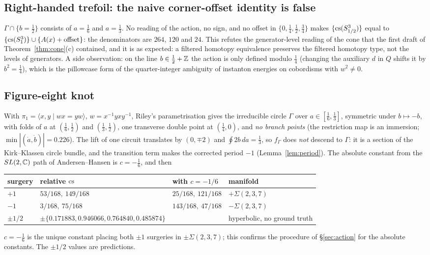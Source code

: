 \subsection{Right-handed trefoil: the naive corner-offset identity is false}
$\Gamma\cap\{b=\tfrac12\}$ consists of $a=\tfrac16$ and $a=\tfrac13$.  No reading of the action, no sign, and no offset
in $\{0,\tfrac14,\tfrac12,\tfrac34\}$ makes $\{\mathrm{cs}(S^3_{1/2})\}$ equal to $\{\mathrm{cs}(S^3_1)\}\cup\{A(x)+\text{offset}\}$:
the denominators are $264$, $120$ and $24$.  This refutes the generator-level reading of the cone that the first
draft of Theorem~\ref{thm:cone}(c) contained, and it is as expected: a filtered homotopy equivalence preserves the
filtered homotopy type, not the levels of generators.  A side observation: on the line $b\in\tfrac12+\mathbb{Z}$ the action
is only defined modulo $\tfrac14$ (changing the auxiliary $d$ in $Q$ shifts it by $b^2=\tfrac14$), which is the
pillowcase form of the quarter-integer ambiguity of instanton energies on cobordisms with $w^2\ne0$.

\subsection{Figure-eight knot}
With $\pi_1=\langle x,y\mid wx=yw\rangle$, $w=x^{-1}yxy^{-1}$, Riley's parametrisation gives the irreducible circle
$\Gamma$ over $a\in[\tfrac16,\tfrac13]$, symmetric under $b\mapsto-b$, with folds of $a$ at $(\tfrac16,\tfrac12)$ and
$(\tfrac13,\tfrac12)$, one transverse double point at $(\tfrac14,0)$, and \emph{no branch points} (the restriction
map is an immersion; $\min|(\dot a,\dot b)|=0.226$).  The lift of one circuit translates by $(0,\mp2)$ and
$\oint2b\,da=\tfrac13$, so $f_\Gamma$ does \emph{not} descend to $\Gamma$: it is a section of the Kirk--Klassen circle
bundle, and the transition term makes the corrected period $-1$ (Lemma~\ref{lem:period}).
The absolute constant from the $SL(2,\mathbb{C})$ path of Andersen--Hansen is $c=-\tfrac16$, and then
\begin{center}\small
\begin{tabular}{llll}
\toprule
surgery & relative $\mathrm{cs}$ & with $c=-1/6$ & manifold\\
\midrule
$+1$ & $53/168,\ 149/168$ & $25/168,\ 121/168$ & $+\Sigma(2,3,7)$\\
$-1$ & $3/168,\ 75/168$ & $143/168,\ 47/168$ & $-\Sigma(2,3,7)$\\
$\pm1/2$ & $\pm\{0.171883,0.946066,0.764840,0.485874\}$ & & hyperbolic, no ground truth\\
\bottomrule
\end{tabular}
\end{center}
$c=-\tfrac16$ is the unique constant placing both $\pm1$ surgeries in $\pm\Sigma(2,3,7)$; this confirms the
procedure of \S\ref{sec:action} for the absolute constants.  The $\pm1/2$ values are predictions.

